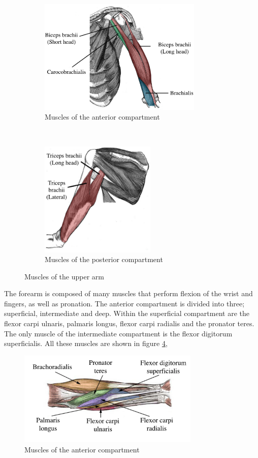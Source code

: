 \begin{figure}[!htpb]
	\begin{subfigure}[t]{0.52\textwidth}
		\centering
		\includegraphics[height=5.5cm,keepaspectratio]{figure15a}
		\caption{Muscles of the anterior compartment}
		\label{fig:upper arm anterior}
	\end{subfigure}
	~
	\begin{subfigure}[t]{0.44\textwidth}
		\centering
		\includegraphics[height=5.5cm,keepaspectratio]{figure15b}
		\caption{Muscles of the posterior compartment}
		\label{fig:upper arm posterior}
	\end{subfigure}
	\caption{Muscles of the upper arm}
\end{figure}

The forearm is composed of many muscles that perform flexion of the wrist and fingers, as well as pronation. The anterior compartment is divided into three; superficial, intermediate and deep. Within the superficial compartment are the flexor carpi ulnaris, palmaris longus, flexor carpi radialis and the pronator teres. The only muscle of the intermediate compartment is the flexor digitorum superficialis. All these muscles are shown in figure \ref{fig:forearm anterior},

\begin{figure}[!htpb]
	\centering
	\includegraphics[height=4.5cm,keepaspectratio]{figure16}
	\caption{Muscles of the anterior compartment}
	\label{fig:forearm anterior}
\end{figure}	

